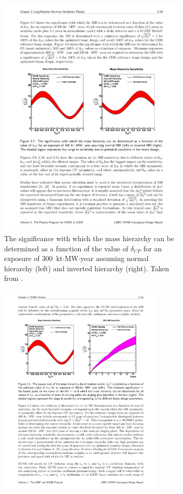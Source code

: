 \begin{figure}
  \centering
  \begin{subfigure}[t]{\linewidth}
    \centering
    \includegraphics[width=16cm]{DUNEMassHierarchyDeltaCP.pdf}
    \caption{The significance with which the mass hierarchy can be determined as a function of the value of $\delta_{CP}$ for an exposure of 300~kt$\cdot$MW$\cdot$year assuming normal hierarchy (left) and inverted hierarchy (right).  Taken from \cite{DUNECDR2}.}
    \label{fig:DUNEMassHierarchyDeltaCP}
  \end{subfigure}
  \hfill
  \vfill
  \begin{subfigure}[t]{\linewidth}
    \centering
    \includegraphics[width=8cm]{DUNEMassHierarchyTime.pdf}

\end{subfigure}
\end{figure}
